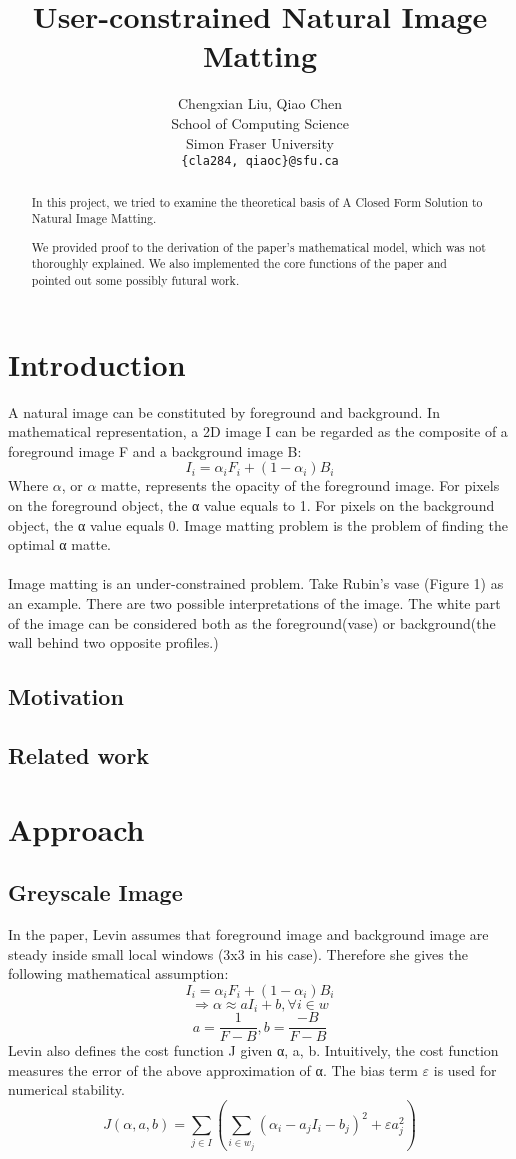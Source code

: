 \documentclass[11pt,letterpaper]{article}
\title{User-constrained Natural Image Matting}
\author{Chengxian Liu, Qiao Chen\\
  School of Computing Science \\ Simon Fraser University \\
  {\tt \{cla284, qiaoc\}@sfu.ca}  
}
\begin{document}
\maketitle
\begin{abstract}
In this project, we tried to examine the theoretical basis of A Closed Form Solution to Natural Image Matting. ~\cite{Levin:2006}

We provided proof to the derivation of the paper’s mathematical model, which was not thoroughly explained. We also implemented the core functions of the paper and pointed out some possibly futural work.
\end{abstract}

\section{Introduction}
A natural image can be constituted by foreground and background. In mathematical representation, a 2D image I can be regarded as the composite of a foreground image F and a background image B:
$$I_{i} = \alpha_{i}F_{i} + (1-\alpha_{i})B_{i}$$
Where $\alpha$, or $\alpha$ matte, represents the opacity of the foreground image. For pixels on the foreground object, the α value equals to 1. For pixels on the background object, the α value equals 0. Image matting problem is the problem of finding the optimal α matte.\\\\
Image matting is an under-constrained problem. Take Rubin’s vase (Figure 1) as an example. There are two possible interpretations of the image. The white part of the image can be considered both as the foreground(vase) or background(the wall behind two opposite profiles.)


\subsection{Motivation}

\subsection{Related work}

\section{Approach}
\subsection{Greyscale Image}
In the paper, Levin assumes that foreground image and background image are steady inside small local windows (3x3 in his case). Therefore she gives the following mathematical assumption:
$$I_i = \alpha_i F_i + (1 - \alpha_i)B_i$$
$$\Rightarrow \alpha \approx aI_{i} + b, \forall i \in w $$
$$a = \frac{1}{F-B}, b = \frac{-B}{F-B} $$
Levin also defines the cost function J given α, a, b. Intuitively, the cost function measures the error of the above approximation of α. The bias term $\varepsilon$ is used for numerical stability.
$$J(\alpha, a, b) = \sum_{j \in I}(\sum_{i \in w_j}(\alpha_i - a_jI_i-b_j)^2+\varepsilon a_j^2)$$
\end{document}
